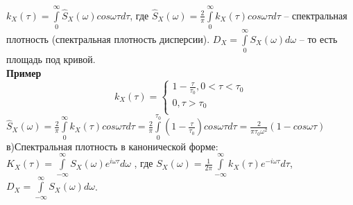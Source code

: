 \documentclass[russian, 12pt, fleqn]{article}
\begin{document}
$k_X(\tau) = \displaystyle{\int \limits_{0}^{\infty}} \hat{S}_X(\omega) cos \omega \tau d\tau$, где $\hat{S}_X (\omega) = \frac{2}{\pi}  \displaystyle{\int \limits_{0}^{\infty}} k_X(\tau) cos \omega \tau d\tau$ -- спектральная плотность (спектральная плотность дисперсии). $D_X =  \displaystyle{\int \limits_{0}^{\infty}} S_X(\omega) d\omega$ -- то есть площадь под кривой.\\
  \textbf{Пример}\\ 
\begin{equation*} 
k_X(\tau)=
 \begin{cases}
   1 - \frac{\tau}{\tau_0}, 0 < \tau < \tau_0 \\
   0 , \tau > \tau_0\\
 \end{cases}
\end{equation*}
$\hat{S}_X(\omega)  = \frac{2}{\pi} \displaystyle{\int \limits_{0}^{\infty}}k_X(\tau) cos \omega \tau d\tau = \frac{2}{\pi}\displaystyle{\int \limits_{0}^{\tau_0}} (1 - \frac{\tau}{\tau_0}) cos \omega \tau d \tau = \frac{2}{\pi \tau_0 \omega^2} (1 - cos \omega \tau)$\\
в)Спектральная плотность в канонической форме:\\
$K_X(\tau) = \displaystyle{\int \limits_{-\infty}^{\infty}} S_X(\omega)e^{i\omega \tau} d\omega$ , где $S_X(\omega) = \frac{1}{2\pi} \displaystyle{\int \limits_{-\infty}^{\infty}} k_X(\tau) e^{-i\omega \tau} d\tau$, $D_X = \displaystyle{\int \limits_{-\infty}^{\infty}} S_X(\omega) d \omega$.\\
\end{document}
